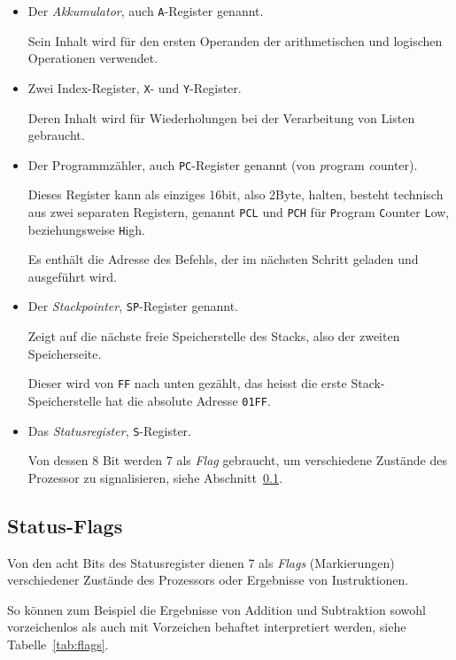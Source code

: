 \documentclass[11pt]{scrartcl}
\newcommand{\byte}{\unit{Byte}}
\newcommand{\bit}{\unit{bit}}
\newcommand{\xreg}{\texttt{X}}
\newcommand{\yreg}{\texttt{Y}}
\newcommand{\acc}{\texttt{A}}
\newcommand{\stp}{\texttt{SP}}
\newcommand{\sreg}{\texttt{S}}
\newcommand{\pc}{\texttt{PC}}
\begin{document}
\begin{itemize}
\item Der \emph{Akkumulator}, auch \acc-Register genannt.
    
  Sein Inhalt wird für den ersten Operanden der arithmetischen und
  logischen Operationen verwendet.
\item Zwei Index-Register, \xreg- und \yreg-Register.
    
  Deren Inhalt wird für Wiederholungen bei der Verarbeitung von Listen
  gebraucht.
\item Der Programmzähler, auch \pc-Register genannt (von
  \emph{p}rogram \emph{c}ounter).

  Dieses Register kann als einziges 16\bit, also 2\byte, halten,
  besteht technisch aus zwei separaten Registern, genannt \texttt{PCL}
  und \texttt{PCH} für \texttt{P}rogram \texttt{C}ounter \texttt{L}ow,
  beziehungsweise \texttt{H}igh.
  
  Es enthält die Adresse des Befehls, der im nächsten Schritt geladen
  und ausgeführt wird.  
\item Der \emph{Stackpointer}, \stp-Register genannt.
     
  Zeigt auf die nächste freie Speicherstelle des Stacks, also der
  zweiten Speicherseite.
    
  Dieser wird von \texttt{FF} nach unten gezählt, das heisst die erste
  Stack-Speicherstelle hat die absolute Adresse \texttt{01FF}.
\item Das \emph{Statusregister}, \sreg-Register.
    
  Von dessen 8 Bit werden 7 als \emph{Flag} gebraucht, um verschiedene
  Zustände des Prozessor zu signalisieren, siehe Abschnitt~\ref{sec:flags}. 
\end{itemize}

\subsection{Status-Flags}
\label{sec:flags}

Von den acht Bits des Statusregister dienen 7 als \emph{Flags} (Markierungen)
verschiedener Zustände des Prozessors oder Ergebnisse von
Instruktionen.

So können zum Beispiel die Ergebnisse von Addition und
Subtraktion sowohl vorzeichenlos als auch mit Vorzeichen behaftet
interpretiert werden, siehe Tabelle~\ref{tab:flags}.
\end{document}
